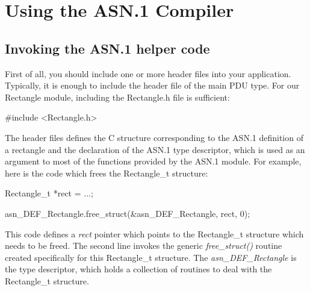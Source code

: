 \documentclass[english,oneside,12pt]{book}
\begin{document}
\chapter{Using the ASN.1 Compiler}


\section[Invoking the helper code]{Invoking the ASN.1 helper code}

First of all, you should include one or more header files into your
application. Typically, it is enough to include the header file of
the main PDU type. For our Rectangle module, including the Rectangle.h
file is sufficient:
\begin{codesample}
#include <Rectangle.h>
\end{codesample}
The header files defines the C structure corresponding to the ASN.1
definition of a rectangle and the declaration of the ASN.1 type descriptor,
which is used as an argument to most of the functions provided by
the ASN.1 module. For example, here is the code which frees the Rectangle\_t
structure:
\begin{codesample}
Rectangle_t *rect = ...;

asn_DEF_Rectangle.free_struct(&asn_DEF_Rectangle, rect, 0);
\end{codesample}
This code defines a \emph{rect} pointer which points to the Rectangle\_t
structure which needs to be freed. The second line invokes the generic
\emph{free\_struct()} routine created specifically for this Rectangle\_t
structure. The \emph{asn\_DEF\_Rectangle} is the type descriptor,
which holds a collection of routines to deal with the Rectangle\_t
structure.
\end{document}
